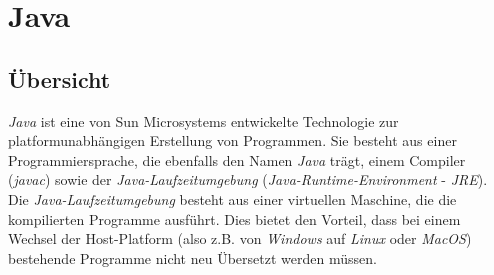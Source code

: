 \section{Java}
    \subsection{Übersicht}

        \emph{Java} ist eine von Sun Microsystems entwickelte Technologie zur platformunabhängigen 
        Erstellung von Programmen. Sie besteht aus einer Programmiersprache, die ebenfalls den Namen
        \emph{Java} trägt, einem Compiler (\emph{javac}) sowie der \emph{Java-Laufzeitumgebung} 
        (\emph{Java-Runtime-Environment} - \emph{JRE}).
        Die \emph{Java-Laufzeitumgebung} besteht aus einer virtuellen Maschine, die die kompilierten Programme ausführt.
        Dies bietet den Vorteil, dass bei einem Wechsel der Host-Platform (also z.B. von \emph{Windows} auf \emph{Linux}
        oder \emph{MacOS}) bestehende Programme nicht neu Übersetzt werden müssen.\\

